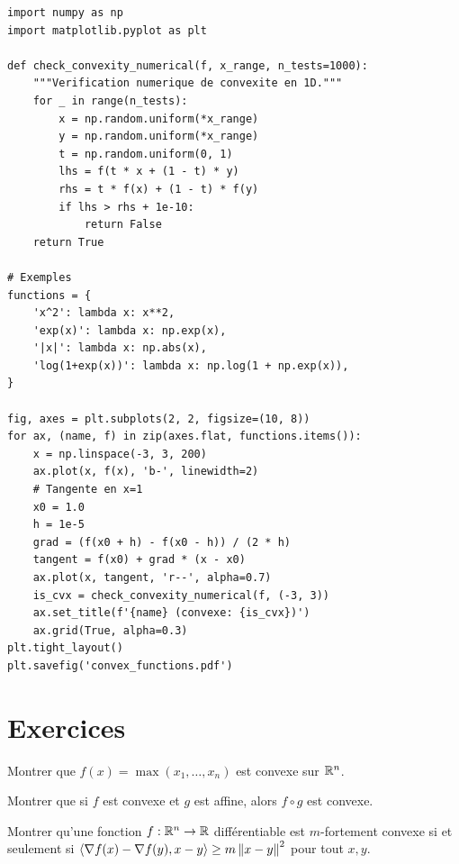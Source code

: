 \begin{codeblock}[title=\textbf{V\'erification de convexit\'e et visualisation}]
\begin{verbatim}
import numpy as np
import matplotlib.pyplot as plt

def check_convexity_numerical(f, x_range, n_tests=1000):
    """Verification numerique de convexite en 1D."""
    for _ in range(n_tests):
        x = np.random.uniform(*x_range)
        y = np.random.uniform(*x_range)
        t = np.random.uniform(0, 1)
        lhs = f(t * x + (1 - t) * y)
        rhs = t * f(x) + (1 - t) * f(y)
        if lhs > rhs + 1e-10:
            return False
    return True

# Exemples
functions = {
    'x^2': lambda x: x**2,
    'exp(x)': lambda x: np.exp(x),
    '|x|': lambda x: np.abs(x),
    'log(1+exp(x))': lambda x: np.log(1 + np.exp(x)),
}

fig, axes = plt.subplots(2, 2, figsize=(10, 8))
for ax, (name, f) in zip(axes.flat, functions.items()):
    x = np.linspace(-3, 3, 200)
    ax.plot(x, f(x), 'b-', linewidth=2)
    # Tangente en x=1
    x0 = 1.0
    h = 1e-5
    grad = (f(x0 + h) - f(x0 - h)) / (2 * h)
    tangent = f(x0) + grad * (x - x0)
    ax.plot(x, tangent, 'r--', alpha=0.7)
    is_cvx = check_convexity_numerical(f, (-3, 3))
    ax.set_title(f'{name} (convexe: {is_cvx})')
    ax.grid(True, alpha=0.3)
plt.tight_layout()
plt.savefig('convex_functions.pdf')
\end{verbatim}
\end{codeblock}

\section{Exercices}

\begin{exercice}[$\star$]
Montrer que $f(x) = \max(x_1, \ldots, x_n)$ est convexe sur $\mathbb{R}^n$.
\end{exercice}

\begin{exercice}[$\star$]
Montrer que si $f$ est convexe et $g$ est affine, alors $f \circ g$ est convexe.
\end{exercice}

\begin{exercice}[$\star\star$]
Montrer qu'une fonction $f : \mathbb{R}^n \to \mathbb{R}$ diff\'erentiable est $m$-fortement convexe
si et seulement si $\langle \nabla f(x) - \nabla f(y), x - y \rangle \geq m\left\| x - y \right\|^2$
pour tout $x, y$.
\end{exercice}

